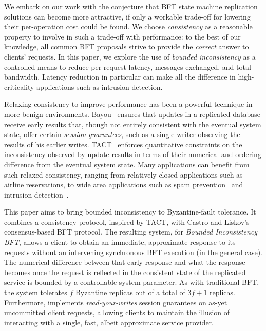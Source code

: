 \documentclass[twocolumn,10pt]{article}
\begin{document}
We embark on our work with the conjecture that BFT state machine
replication solutions can become more attractive, if only a workable
trade-off for lowering their per-operation cost could be
found.  We choose \emph{consistency} as a reasonable property to involve
in such a trade-off with performance: to the best of our knowledge, all
common BFT proposals strive to provide the \emph{correct} answer to
clients' requests.  In this paper, we explore the
use of \emph{bounded inconsistency} as a controlled means to reduce
per-request latency, messages exchanged, and total bandwidth.
Latency reduction in particular can make all the difference in
high-criticality applications such as intrusion detection.

Relaxing consistency to improve performance has been a powerful
technique in more benign environments. Bayou~\cite{Petersen1997}
ensures that updates in a replicated database receive early results that,
though not entirely consistent with the eventual system state, offer
certain \emph{session guarantees}, such as a single writer observing the
results of his earlier writes.  TACT~\cite{Yu2002} enforces quantitative
constraints on the inconsistency observed by update results in terms
of their numerical and ordering difference from the eventual system
state. Many applications can benefit from such relaxed consistency,
ranging from relatively closed applications such as airline
reservations, to wide area applications such as spam
prevention~\cite{Walfish2006} and intrusion detection~\cite{Huang2006}.

This paper aims to bring bounded inconsistency to Byzantine-fault
tolerance.  It combines a consistency protocol, inspired by TACT, with
Castro and Liskov's consensus-based BFT protocol.  The resulting system,
\Sys for \emph{Bounded Inconsistency BFT}, allows a client to obtain an
immediate, approximate response to its requests without an intervening synchronous BFT
execution (in the general case).  The numerical difference between that
early response and what the response becomes once the request is
reflected in the consistent state of the replicated service is bounded
by a controllable system parameter.  As with traditional BFT, the system
tolerates $f$ Byzantine replicas out of a total of
$3f+1$ replicas.  Furthermore, \Sys implements \emph{read-your-writes}
session guarantees on as-yet uncommitted client requests, allowing
clients to maintain the illusion of interacting with a single, fast,
albeit approximate service provider.
\end{document}
